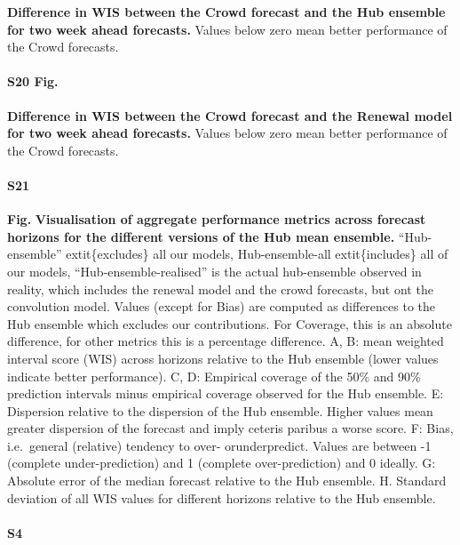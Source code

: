\documentclass[10pt,letterpaper]{article}
\begin{document}
\textbf{Difference in WIS between the Crowd forecast and the Hub ensemble for two week ahead forecasts.}
Values below zero mean better performance of the Crowd forecasts.

\paragraph{S20 Fig.}
\label{fig:distribution-scores-differences-renewal}

\textbf{Difference in WIS between the Crowd forecast and the Renewal model for two week ahead forecasts.}
Values below zero mean better performance of the Crowd forecasts.

\paragraph{S21}

\textbf{Fig.} \label{fig:agg-performance-ensemble-mean}
\textbf{Visualisation of aggregate performance metrics across forecast horizons for the different versions of the Hub mean ensemble.}
``Hub-ensemble'' extit\{excludes\} all our models, Hub-ensemble-all
extit\{includes\} all of our models, ``Hub-ensemble-realised'' is the
actual hub-ensemble observed in reality, which includes the renewal
model and the crowd forecasts, but ont the convolution model. Values
(except for Bias) are computed as differences to the Hub ensemble which
excludes our contributions. For Coverage, this is an absolute
difference, for other metrics this is a percentage difference. A, B:
mean weighted interval score (WIS) across horizons relative to the Hub
ensemble (lower values indicate better performance). C, D: Empirical
coverage of the 50\% and 90\% prediction intervals minus empirical
coverage observed for the Hub ensemble. E: Dispersion relative to the
dispersion of the Hub ensemble. Higher values mean greater dispersion of
the forecast and imply ceteris paribus a worse score. F: Bias,
i.e.~general (relative) tendency to over- orunderpredict. Values are
between -1 (complete under-prediction) and 1 (complete over-prediction)
and 0 ideally. G: Absolute error of the median forecast relative to the
Hub ensemble. H. Standard deviation of all WIS values for different
horizons relative to the Hub ensemble.

\paragraph{S4}
\end{document}
